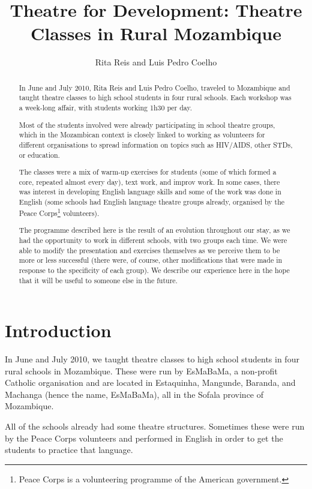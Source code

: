 \documentclass[article,twocolumn,twoside]{memoir}
\title{Theatre for Development: Theatre Classes in Rural Mozambique}
\author{Rita Reis and Luis Pedro Coelho}
\begin{document}
\maketitle

\begin{abstract}
In June and July 2010, Rita Reis and Luis Pedro Coelho, traveled to Mozambique
and taught theatre classes to high school students in four rural schools. Each
workshop was a week-long affair, with students working 1h30 per day.

Most of the students involved were already participating in school theatre
groups, which in the Mozambican context is closely linked to working as
volunteers for different organisations to spread information on topics such as
HIV/AIDS, other STDs, or education.

The classes were a mix of warm-up exercises for students (some of which formed
a core, repeated almost every day), text work, and improv work. In some cases,
there was interest in developing English language skills and some of the work
was done in English (some schools had English language theatre groups already,
organised by the Peace Corps\footnote{Peace Corps is a volunteering programme
of the American government.} volunteers).

The programme described here is the result of an evolution throughout our stay,
as we had the opportunity to work in different schools, with two groups each
time. We were able to modify the presentation and exercises themselves as we
perceive them to be more or less successful (there were, of course, other
modifications that were made in response to the specificity of each group). We
describe our experience here in the hope that it will be useful to someone else
in the future.

\end{abstract}

\chapter{Introduction}
In June and July 2010, we taught theatre classes to high school students in
four rural schools in Mozambique. These were run by EsMaBaMa, a non-profit
Catholic organisation and are located in Estaquinha, Mangunde, Baranda, and
Machanga (hence the name, EsMaBaMa), all in the Sofala province of Mozambique.

All of the schools already had some theatre structures. Sometimes these were
run by the Peace Corps volunteers and performed in English in order to get the
students to practice that language.
\end{document}
